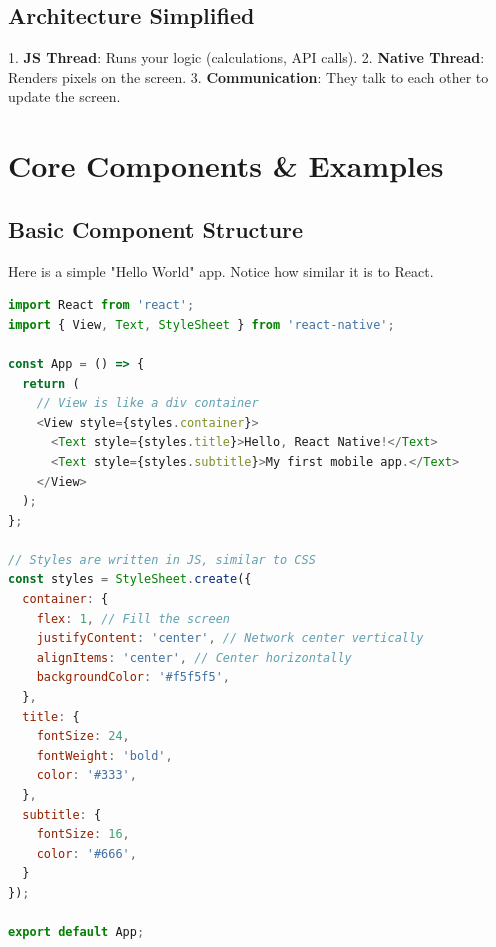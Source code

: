 \documentclass[11pt,a4paper,oneside]{book}
\begin{document}
\section{Architecture Simplified}

\begin{center}
\end{center}

1. \textbf{JS Thread}: Runs your logic (calculations, API calls).
2. \textbf{Native Thread}: Renders pixels on the screen.
3. \textbf{Communication}: They talk to each other to update the screen.

\chapter{Core Components & Examples}

\section{Basic Component Structure}

Here is a simple "Hello World" app. Notice how similar it is to React.

\begin{lstlisting}[language=JavaScript, caption=App.js]
import React from 'react';
import { View, Text, StyleSheet } from 'react-native';

const App = () => {
  return (
    // View is like a div container
    <View style={styles.container}>
      <Text style={styles.title}>Hello, React Native!</Text>
      <Text style={styles.subtitle}>My first mobile app.</Text>
    </View>
  );
};

// Styles are written in JS, similar to CSS
const styles = StyleSheet.create({
  container: {
    flex: 1, // Fill the screen
    justifyContent: 'center', // Network center vertically
    alignItems: 'center', // Center horizontally
    backgroundColor: '#f5f5f5',
  },
  title: {
    fontSize: 24,
    fontWeight: 'bold',
    color: '#333',
  },
  subtitle: {
    fontSize: 16,
    color: '#666',
  }
});

export default App;
\end{lstlisting}
\end{document}
